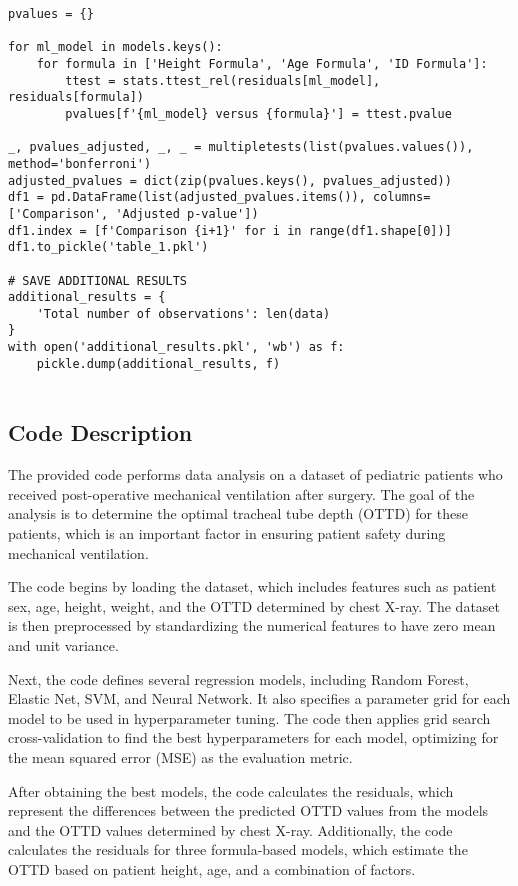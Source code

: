 \documentclass[11pt]{article}
\begin{document}
\begin{verbatim}
pvalues = {}

for ml_model in models.keys():
    for formula in ['Height Formula', 'Age Formula', 'ID Formula']:
        ttest = stats.ttest_rel(residuals[ml_model], residuals[formula])
        pvalues[f'{ml_model} versus {formula}'] = ttest.pvalue

_, pvalues_adjusted, _, _ = multipletests(list(pvalues.values()), method='bonferroni')
adjusted_pvalues = dict(zip(pvalues.keys(), pvalues_adjusted))
df1 = pd.DataFrame(list(adjusted_pvalues.items()), columns=['Comparison', 'Adjusted p-value'])
df1.index = [f'Comparison {i+1}' for i in range(df1.shape[0])]
df1.to_pickle('table_1.pkl')

# SAVE ADDITIONAL RESULTS
additional_results = {
    'Total number of observations': len(data)
}
with open('additional_results.pkl', 'wb') as f:
    pickle.dump(additional_results, f)


\end{verbatim}

\subsection{Code Description}

The provided code performs data analysis on a dataset of pediatric patients who received post-operative mechanical ventilation after surgery. The goal of the analysis is to determine the optimal tracheal tube depth (OTTD) for these patients, which is an important factor in ensuring patient safety during mechanical ventilation.

The code begins by loading the dataset, which includes features such as patient sex, age, height, weight, and the OTTD determined by chest X-ray. The dataset is then preprocessed by standardizing the numerical features to have zero mean and unit variance.

Next, the code defines several regression models, including Random Forest, Elastic Net, SVM, and Neural Network. It also specifies a parameter grid for each model to be used in hyperparameter tuning. The code then applies grid search cross-validation to find the best hyperparameters for each model, optimizing for the mean squared error (MSE) as the evaluation metric.

After obtaining the best models, the code calculates the residuals, which represent the differences between the predicted OTTD values from the models and the OTTD values determined by chest X-ray. Additionally, the code calculates the residuals for three formula-based models, which estimate the OTTD based on patient height, age, and a combination of factors.
\end{document}
